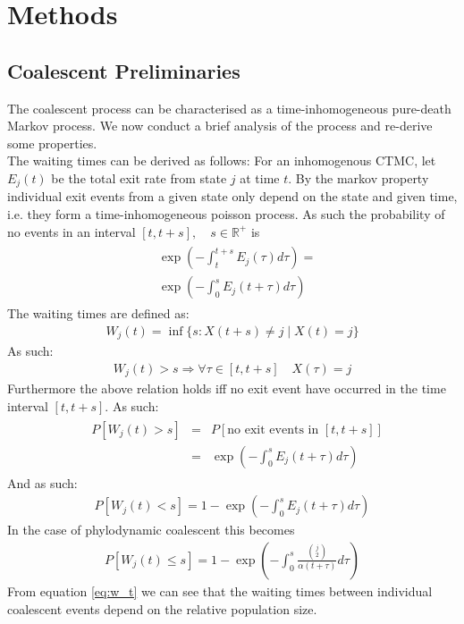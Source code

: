 \documentclass{ieeeaccess}
\newcommand{\R}{\mathbb{R}}
\theoremstyle{definition}
\begin{document}
\section{Methods}
\subsection{Coalescent Preliminaries}
The coalescent process can be characterised as a time-inhomogeneous pure-death Markov process. We now conduct a brief analysis of the process and re-derive some properties.\\
The waiting times can be derived as follows:
For an inhomogenous CTMC, let $E_j(t)$ be the total exit rate from state $j$ at time $t$.
By the markov property individual exit events from a given state only depend on the state and given time, i.e. they form a time-inhomogeneous poisson process.
As such the probability of no events in an interval $[t,t+s],\quad s\in \R^+$ is 
\begin{gather}
\begin{aligned}
&\exp(-\int_t^{t+s}E_j(\tau)d\tau) =\\
&\exp(-\int_0^{s}E_j(t+\tau)d\tau)
\end{aligned}
\end{gather}
The waiting times are defined as:
\begin{gather}
W_j(t) = \inf\{s:X(t+s)\neq j \mid X(t) = j\}
\end{gather}
As such:
\begin{gather}
W_j(t) > s \Rightarrow \forall \tau\in[t, t+s]\quad X(\tau) = j
\end{gather}
Furthermore the above relation holds iff no exit event have occurred in the time interval $[t,t+s]$. As such:
\begin{gather}
\begin{aligned}
&P[W_j(t) > s] &=& P[\text{no exit events in }[t,t+s]]\\ 
&&=& \exp(-\int_0^{s}E_j(t+\tau)d\tau)
\end{aligned}
\end{gather}
And as such:
\begin{gather}
P[W_j(t) < s] = 1 - \exp(-\int_0^{s}E_j(t+\tau)d\tau)
\end{gather}
In the case of phylodynamic coalescent this becomes
\begin{gather}\label{eq:w_t}
P[W_j(t) \leq s] = 1 - \exp(-\int_0^{s}\frac{\binom{j}{2}}{\alpha(t+\tau)}d\tau)
\end{gather}
From equation \ref{eq:w_t} we can see that the waiting times between individual coalescent events depend on the relative population size.
\end{document}
